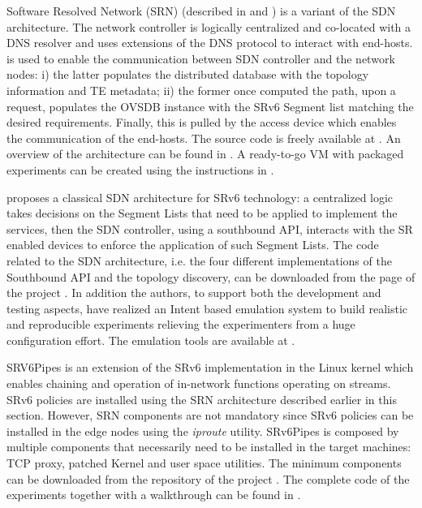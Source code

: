 Software Resolved Network (SRN) (described in \cite{lebrun2018software} and \cite{duchene2018exploring}) is a variant of the SDN architecture. The network controller is logically centralized and co-located with a DNS resolver and uses extensions of the DNS protocol to interact with end-hosts.  \cite{rfc7047} is used to enable the communication between SDN controller and the network nodes: i) the latter populates the distributed database with the topology information and TE metadata; ii) the former once computed the path, upon a request, populates the OVSDB instance with the SRv6 Segment list matching the desired requirements. Finally, this is pulled by the access device which enables the communication of the end-hosts. The source code is freely available at \cite{srn-code}. An overview of the architecture can be found in \cite{srn-overview}. A ready-to-go VM with packaged experiments can be created using the instructions in \cite{srn-vm}.

\cite{ventre2018sdn} proposes a classical SDN architecture for SRv6 technology: a centralized logic takes decisions on the Segment Lists that need to be applied to implement the services, then the SDN controller, using a southbound API, interacts with the SR enabled devices to enforce the application of such Segment Lists. The code related to the SDN architecture, i.e. the four different implementations of the Southbound API and the topology discovery, can be downloaded from the page of the project \cite{srv6-sdn}. In addition the authors, to support both the development and testing aspects, have realized an Intent based emulation system to build realistic and reproducible experiments relieving the experimenters from a huge configuration effort. The emulation tools are available at \cite{rose}.

SRV6Pipes \cite{duchene2018srv6pipes} is an extension of the SRv6 implementation in the Linux kernel \cite{lebrun2017implementing} which enables chaining and operation of in-network functions operating on streams. SRv6 policies are installed using the SRN architecture \cite{lebrun2018software} described earlier in this section. However, SRN components are not mandatory since SRv6 policies can be installed in the edge nodes using the \textit{iproute} utility. SRv6Pipes is composed by multiple components that necessarily need to be installed in the target machines: TCP proxy, patched Kernel and user space utilities. The minimum components can be downloaded from the repository of the project \cite{srv6pipes-code}. The complete code of the experiments together with a walkthrough can be found in \cite{srv6pipes}.


